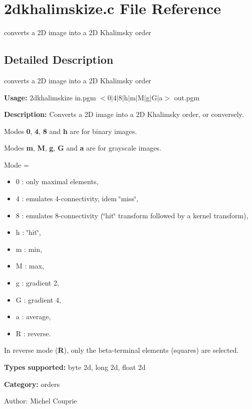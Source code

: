 \section{2dkhalimskize.c File Reference}
\label{2dkhalimskize_8c}
converts a 2D image into a 2D Khalimsky order 



\subsection{Detailed Description}
converts a 2D image into a 2D Khalimsky order 

{\bf Usage:} 2dkhalimskize in.pgm $<$0$|$4$|$8$|$h$|$m$|$M$|$g$|$G$|$a$>$ out.pgm

{\bf Description:} Converts a 2D image into a 2D Khalimsky order, or conversely.

Modes {\bf 0}, {\bf 4}, {\bf 8} and {\bf h} are for binary images.

Modes {\bf m}, {\bf M}, {\bf g}, {\bf G} and {\bf a} are for grayscale images.

Mode = \begin{itemize}
\item 0 : only maximal elements, \item 4 : emulates 4-connectivity, idem \char`\"{}miss\char`\"{}, \item 8 : emulates 8-connectivity (\char`\"{}hit\char`\"{} transform followed by a kernel transform), \item h : \char`\"{}hit\char`\"{}, \item m : min, \item M : max, \item g : gradient 2, \item G : gradient 4, \item a : average, \item R : reverse.\end{itemize}
In reverse mode ({\bf R}), only the beta-terminal elements (squares) are selected.

{\bf Types supported:} byte 2d, long 2d, float 2d

{\bf Category:} orders

\begin{Desc}
\item[Author:]Michel Couprie \end{Desc}

